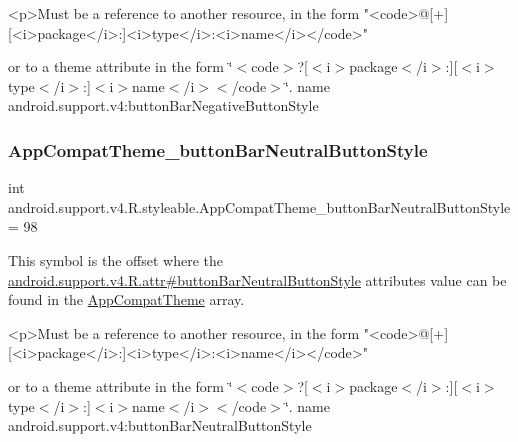 \begin{DoxyVerb}      <p>Must be a reference to another resource, in the form "<code>@[+][<i>package</i>:]<i>type</i>:<i>name</i></code>"
\end{DoxyVerb}
 or to a theme attribute in the form \char`\"{}$<$code$>$?\mbox{[}$<$i$>$package$<$/i$>$\+:\mbox{]}\mbox{[}$<$i$>$type$<$/i$>$\+:\mbox{]}$<$i$>$name$<$/i$>$$<$/code$>$\char`\"{}.  name android.\+support.\+v4\+:button\+Bar\+Negative\+Button\+Style \mbox{\label{classandroid_1_1support_1_1v4_1_1R_1_1styleable_aa58b2ce8a1ce16e8e54a6c8b84a6d15c}} 
\subsubsection{\texorpdfstring{App\+Compat\+Theme\+\_\+button\+Bar\+Neutral\+Button\+Style}{AppCompatTheme\_buttonBarNeutralButtonStyle}}
{\footnotesize\ttfamily int android.\+support.\+v4.\+R.\+styleable.\+App\+Compat\+Theme\+\_\+button\+Bar\+Neutral\+Button\+Style = 98\hspace{0.3cm}{\ttfamily [static]}}

This symbol is the offset where the \hyperlink{classandroid_1_1support_1_1v4_1_1R_1_1attr_a67442feaeed5f77a8c983a06db98cbac}{android.\+support.\+v4.\+R.\+attr\#button\+Bar\+Neutral\+Button\+Style} attribute\textquotesingle{}s value can be found in the \hyperlink{classandroid_1_1support_1_1v4_1_1R_1_1styleable_ac07ebbe62ed977f6dcaadc6397840ace}{App\+Compat\+Theme} array.

\begin{DoxyVerb}      <p>Must be a reference to another resource, in the form "<code>@[+][<i>package</i>:]<i>type</i>:<i>name</i></code>"
\end{DoxyVerb}
 or to a theme attribute in the form \char`\"{}$<$code$>$?\mbox{[}$<$i$>$package$<$/i$>$\+:\mbox{]}\mbox{[}$<$i$>$type$<$/i$>$\+:\mbox{]}$<$i$>$name$<$/i$>$$<$/code$>$\char`\"{}.  name android.\+support.\+v4\+:button\+Bar\+Neutral\+Button\+Style \mbox{\label{classandroid_1_1support_1_1v4_1_1R_1_1styleable_a94cd4ce61573e443fe4e9bb2a2d8e7c7}} 
